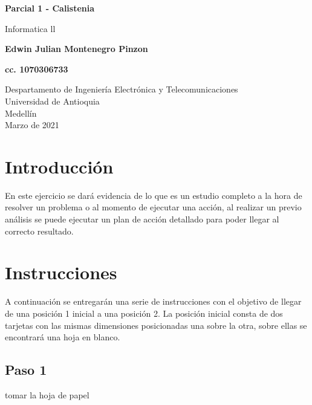 \documentclass{article}
\begin{document}
\begin{titlepage}
    \begin{center}
        \vspace*{1cm}
            
        \Huge
        \textbf{Parcial 1 - Calistenia}
            
        \vspace{0.5cm}
        \LARGE
        Informatica ll
            
        \vspace{1.5cm}
            
        \textbf{Edwin Julian Montenegro Pinzon}
        
        \textbf{cc. 1070306733}
            
        \vfill
            
        \vspace{0.8cm}
            
        \Large
        Despartamento de Ingeniería Electrónica y Telecomunicaciones\\
        Universidad de Antioquia\\
        Medellín\\
        Marzo de 2021
            
    \end{center}
\end{titlepage}

\tableofcontents
\newpage
\section{Introducción}\label{intro}
En este ejercicio se dará evidencia de lo que es un estudio completo a la hora de resolver un problema o al momento de ejecutar una acción, al realizar un previo análisis se puede ejecutar un plan de acción detallado para poder llegar al correcto resultado.

\section{Instrucciones} \label{contenido}
A continuación se entregarán una serie de instrucciones con el objetivo de llegar de una posición 1 inicial a una posición 2. La posición inicial consta de dos tarjetas con las mismas dimensiones posicionadas una sobre la otra, sobre ellas se encontrará una hoja en blanco.
\subsection{Paso 1}
tomar la hoja de papel 
\end{document}
